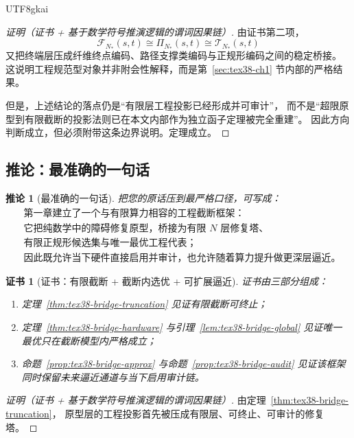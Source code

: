 \documentclass[12pt]{article}
\newtheorem{corollary}{推论}[section]
\newtheorem{Certificate}{证书}[section]
\begin{document}
\begin{CJK*}{UTF8}{gkai}
\begin{proof}[证明（证书 + 基于数学符号推演逻辑的谓词因果链）]
由证书第二项，
\[
  \mathcal{F}_{N_\ast}(s,t)
  \cong
  \Pi_{N_\ast}(s,t)
  \cong
  \mathcal{T}_{N_\ast}(s,t)
\]
又把终端层压成纤维终点编码、路径支撑类编码与正规形编码之间的稳定桥接。
这说明工程规范型对象并非附会性解释，而是第~\ref{sec:tex38-ch1} 节内部的严格结果。

但是，上述结论的落点仍是“有限层工程投影已经形成并可审计”，
而不是“超限原型到有限截断的投影法则已在本文内部作为独立函子定理被完全重建”。
因此方向判断成立，但必须附带这条边界说明。定理成立。
\end{proof}

\subsection{推论：最准确的一句话}
\label{subsec:tex38-bridge-corollary}

\begin{corollary}[最准确的一句话]
\label{cor:tex38-bridge-sentence}
把您的原话压到最严格口径，可写成：
\[
  \begin{aligned}
    &\text{第一章建立了一个与有限算力相容的工程截断框架：}\\
    &\text{它把纯数学中的障碍修复原型，桥接为有限 $N$ 层修复塔、}\\
    &\text{有限正规形候选集与唯一最优工程代表；}\\
    &\text{因此既允许当下硬件直接启用并审计，也允许随着算力提升做更深层逼近。}
  \end{aligned}
\]
\end{corollary}

\begin{Certificate}[证书：有限截断 + 截断内选优 + 可扩展逼近]
\label{cert:tex38-bridge-sentence}
证书由三部分组成：
\begin{enumerate}
  \item 定理~\ref{thm:tex38-bridge-truncation} 见证有限截断可终止；
  \item 定理~\ref{thm:tex38-bridge-hardware} 与引理~\ref{lem:tex38-bridge-global} 见证唯一最优只在截断模型内严格成立；
  \item 命题~\ref{prop:tex38-bridge-approx} 与命题~\ref{prop:tex38-bridge-audit} 见证该框架同时保留未来逼近通道与当下启用审计链。
\end{enumerate}
\end{Certificate}

\begin{proof}[证明（证书 + 基于数学符号推演逻辑的谓词因果链）]
由定理~\ref{thm:tex38-bridge-truncation}，
原型层的工程投影首先被压成有限层、可终止、可审计的修复塔。


\end{proof}
\end{CJK*}
\end{document}

